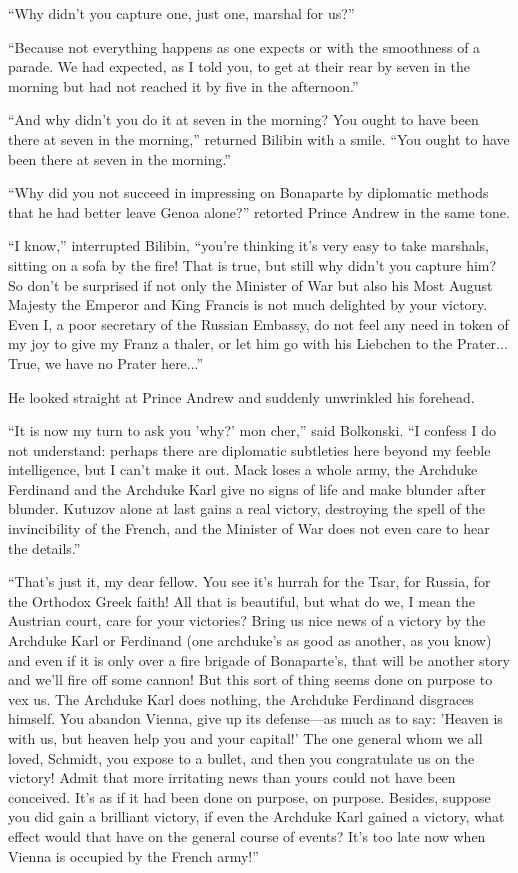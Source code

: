 ``Why didn't you capture one, just one, marshal for us?''

``Because not everything happens as one expects or with the
smoothness of a parade. We had expected, as I told you, to get at
their rear by seven in the morning but had not reached it by five
in the afternoon.''

``And why didn't you do it at seven in the morning? You ought to
have been there at seven in the morning,'' returned Bilibin with
a smile. ``You ought to have been there at seven in the
morning.''

``Why did you not succeed in impressing on Bonaparte by
diplomatic methods that he had better leave Genoa alone?''
retorted Prince Andrew in the same tone.

``I know,'' interrupted Bilibin, ``you're thinking it's very easy
to take marshals, sitting on a sofa by the fire! That is true,
but still why didn't you capture him? So don't be surprised if
not only the Minister of War but also his Most August Majesty the
Emperor and King Francis is not much delighted by your
victory. Even I, a poor secretary of the Russian Embassy, do not
feel any need in token of my joy to give my Franz a thaler, or
let him go with his Liebchen to the Prater... True, we have no
Prater here...''

He looked straight at Prince Andrew and suddenly unwrinkled his
forehead.

``It is now my turn to ask you 'why?' mon cher,'' said
Bolkonski. ``I confess I do not understand: perhaps there are
diplomatic subtleties here beyond my feeble intelligence, but I
can't make it out. Mack loses a whole army, the Archduke
Ferdinand and the Archduke Karl give no signs of life and make
blunder after blunder. Kutuzov alone at last gains a real
victory, destroying the spell of the invincibility of the French,
and the Minister of War does not even care to hear the details.''

``That's just it, my dear fellow. You see it's hurrah for the
Tsar, for Russia, for the Orthodox Greek faith! All that is
beautiful, but what do we, I mean the Austrian court, care for
your victories? Bring us nice news of a victory by the Archduke
Karl or Ferdinand (one archduke's as good as another, as you
know) and even if it is only over a fire brigade of Bonaparte's,
that will be another story and we'll fire off some cannon! But
this sort of thing seems done on purpose to vex us. The Archduke
Karl does nothing, the Archduke Ferdinand disgraces himself.  You
abandon Vienna, give up its defense---as much as to say: 'Heaven
is with us, but heaven help you and your capital!' The one
general whom we all loved, Schmidt, you expose to a bullet, and
then you congratulate us on the victory! Admit that more
irritating news than yours could not have been conceived. It's as
if it had been done on purpose, on purpose.  Besides, suppose you
did gain a brilliant victory, if even the Archduke Karl gained a
victory, what effect would that have on the general course of
events? It's too late now when Vienna is occupied by the French
army!''

